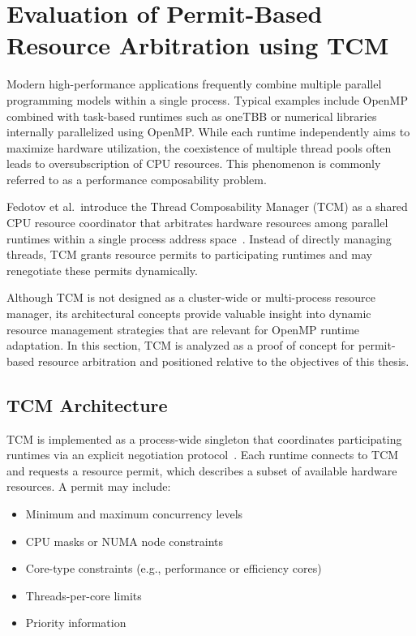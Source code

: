 
\chapter{Evaluation of Permit-Based Resource Arbitration using TCM}\label{chapter:poc_tcm}

Modern high-performance applications frequently combine multiple parallel programming models within a single process. Typical examples include OpenMP combined with task-based runtimes such as oneTBB or numerical libraries internally parallelized using OpenMP. While each runtime independently aims to maximize hardware utilization, the coexistence of multiple thread pools often leads to oversubscription of CPU resources. This phenomenon is commonly referred to as a performance composability problem.

Fedotov et al.\ introduce the Thread Composability Manager (TCM) as a shared CPU resource coordinator that arbitrates hardware resources among parallel runtimes within a single process address space~\parencite{fedotov_case_nodate}. Instead of directly managing threads, TCM grants resource permits to participating runtimes and may renegotiate these permits dynamically.

Although TCM is not designed as a cluster-wide or multi-process resource manager, its architectural concepts provide valuable insight into dynamic resource management strategies that are relevant for OpenMP runtime adaptation. In this section, TCM is analyzed as a proof of concept for permit-based resource arbitration and positioned relative to the objectives of this thesis.

\section{TCM Architecture}

TCM is implemented as a process-wide singleton that coordinates participating runtimes via an explicit negotiation protocol~\parencite{fedotov_case_nodate}. Each runtime connects to TCM and requests a resource permit, which describes a subset of available hardware resources. A permit may include:
\begin{itemize}
  \item Minimum and maximum concurrency levels
  \item CPU masks or NUMA node constraints
  \item Core-type constraints (e.g., performance or efficiency cores)
  \item Threads-per-core limits
  \item Priority information
\end{itemize}


